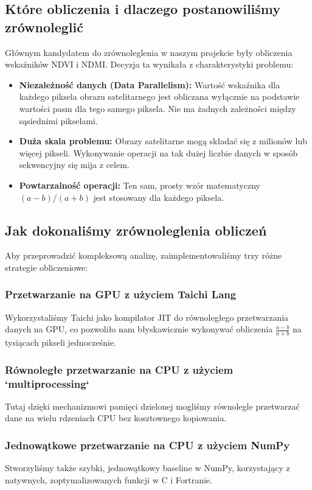 \documentclass[12pt,a4paper]{article}
\begin{document}
\subsection{Które obliczenia i dlaczego postanowiliśmy zrównoleglić}
Głównym kandydatem do zrównoleglenia w naszym projekcie były obliczenia wskaźników NDVI i NDMI. Decyzja ta wynikała z charakterystyki problemu:
\begin{itemize}
    \item \textbf{Niezależność danych (Data Parallelism):} Wartość wskaźnika dla każdego piksela obrazu satelitarnego jest obliczana wyłącznie na podstawie wartości pasm dla tego samego piksela. Nie ma żadnych zależności między sąsiednimi pikselami.
    \item \textbf{Duża skala problemu:} Obrazy satelitarne mogą składać się z milionów lub więcej pikseli. Wykonywanie operacji na tak dużej liczbie danych w sposób sekwencyjny się mija z celem.
    \item \textbf{Powtarzalność operacji:} Ten sam, prosty wzór matematyczny \((a-b)/(a+b)\) jest stosowany dla każdego piksela.
\end{itemize}

\subsection{Jak dokonaliśmy zrównoleglenia obliczeń}
Aby przeprowadzić kompleksową analizę, zaimplementowaliśmy trzy różne strategie obliczeniowe:

\subsubsection{Przetwarzanie na GPU z użyciem Taichi Lang}
Wykorzystaliśmy Taichi jako kompilator JIT do równoległego przetwarzania danych na GPU, co pozwoliło nam błyskawicznie wykonywać obliczenia \(\frac{a-b}{a+b}\) na tysiącach pikseli jednocześnie.

\subsubsection{Równoległe przetwarzanie na CPU z użyciem `multiprocessing`}
Tutaj dzięki mechanizmowi pamięci dzielonej mogliśmy równolegle przetwarzać dane na wielu rdzeniach CPU bez kosztownego kopiowania.

\subsubsection{Jednowątkowe przetwarzanie na CPU z użyciem NumPy}
Stworzyliśmy także szybki, jednowątkowy baseline w NumPy, korzystający z natywnych, zoptymalizowanych funkcji w C i Fortranie.
\end{document}
